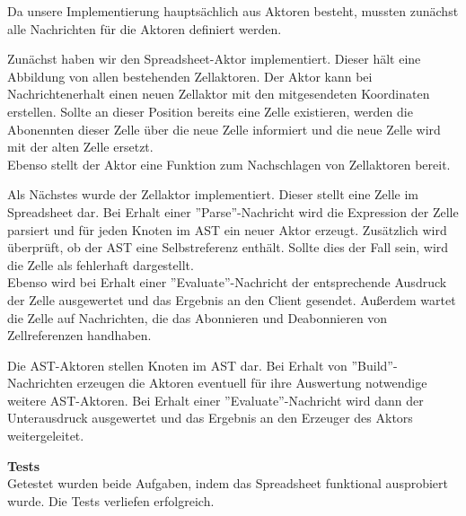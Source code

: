 \documentclass{rp}
\begin{document}
Da unsere Implementierung hauptsächlich aus Aktoren besteht, mussten zunächst alle Nachrichten für die Aktoren definiert werden. 

Zunächst haben wir den Spreadsheet-Aktor implementiert. Dieser hält eine Abbildung von allen bestehenden Zellaktoren. Der Aktor kann bei Nachrichtenerhalt einen neuen Zellaktor mit den mitgesendeten Koordinaten erstellen. Sollte an dieser Position bereits eine Zelle existieren, werden die Abonennten dieser Zelle über die neue Zelle informiert und die neue Zelle wird mit der alten Zelle ersetzt. \\
Ebenso stellt der Aktor eine Funktion zum Nachschlagen von Zellaktoren bereit.

Als Nächstes wurde der Zellaktor implementiert. Dieser stellt eine Zelle im Spreadsheet dar. Bei Erhalt einer ''Parse''-Nachricht wird die Expression der Zelle parsiert und für jeden Knoten im AST ein neuer Aktor erzeugt. Zusätzlich wird überprüft, ob der AST eine Selbstreferenz enthält. Sollte dies der Fall sein, wird die Zelle als fehlerhaft dargestellt. \\ 
Ebenso wird bei Erhalt einer ''Evaluate''-Nachricht der entsprechende Ausdruck der Zelle ausgewertet und das Ergebnis an den Client gesendet. Außerdem wartet die Zelle auf Nachrichten, die das Abonnieren und Deabonnieren von Zellreferenzen handhaben.

Die AST-Aktoren stellen Knoten im AST dar. Bei Erhalt von ''Build''-Nachrichten erzeugen die Aktoren eventuell für ihre Auswertung notwendige weitere AST-Aktoren. Bei Erhalt einer ''Evaluate''-Nachricht wird dann der Unterausdruck ausgewertet und das Ergebnis an den Erzeuger des Aktors weitergeleitet.

\textbf{Tests}\\
Getestet wurden beide Aufgaben, indem das Spreadsheet funktional ausprobiert wurde. Die Tests verliefen erfolgreich.
\end{document}
